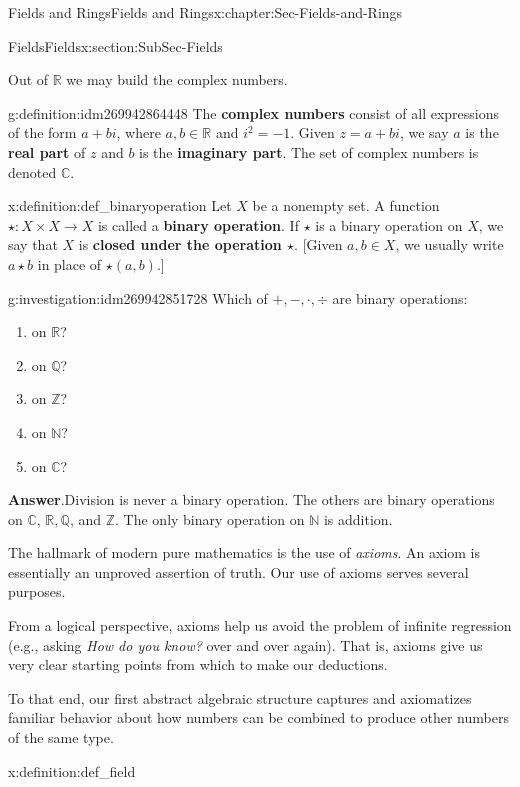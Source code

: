 \documentclass[oneside,10pt,]{book}
\newcommand{\terminology}[1]{\textbf{#1}}
\numberwithin{equation}{section}
\def\C{{\mathbb C}}
\def\Z{{\mathbb Z}}
\def\Q{{\mathbb Q}}
\def\N{{\mathbb N}}
\def\R{{\mathbb R}}
\begin{document}
\begin{chapterptx}{Fields and Rings}{}{Fields and Rings}{}{}{x:chapter:Sec-Fields-and-Rings}
\begin{sectionptx}{Fields}{}{Fields}{}{}{x:section:SubSec-Fields}
\par
Out of \(\R\) we may build the complex numbers.%
\begin{definition}{}{g:definition:idm269942864448}%
The \terminology{complex numbers} consist of all expressions of the form \(a+bi\), where \(a,b\in \R\) and \(i^2 = -1\). Given \(z = a+bi\), we say \(a\) is the \terminology{real part} of \(z\) and \(b\) is the \terminology{imaginary part}. The set of complex numbers is denoted \(\C\).%
\end{definition}
\begin{definition}{}{x:definition:def_binaryoperation}%
 Let \(X\) be a nonempty set. A function \(\star : X \times X \to X\) is called a \terminology{binary operation}. If \(\star\) is a binary operation on \(X\), we say that \(X\) is \terminology{closed under the operation \(\star\)}. [Given \(a,b\in X\), we usually write \(a\star b\) in place of \(\star(a,b)\).]%
\end{definition}
\begin{investigation}{}{g:investigation:idm269942851728}%
Which of \(+, -, \cdot, \div\) are binary operations:%
\begin{enumerate}
\item{}on \(\R\)?%
\item{}on \(\Q\)?%
\item{}on \(\Z\)?%
\item{}on \(\N\)?%
\item{}on \(\C\)?%
\end{enumerate}
%
\par\smallskip%
\noindent\textbf{Answer}.\hypertarget{g:answer:idm269942843328}{}\quad{}Division is never a binary operation. The others are binary operations on \(\C\), \(\R, \Q\), and \(\Z\). The only binary operation on \(\N\) is addition.%
\end{investigation}
The hallmark of modern pure mathematics is the use of \emph{axioms}. An axiom is essentially an unproved assertion of truth. Our use of axioms serves several purposes.%
\par
From a logical perspective, axioms help us avoid the problem of infinite regression (e.g., asking \emph{How do you know?} over and over again). That is, axioms give us very clear starting points from which to make our deductions.%
\par
To that end, our first abstract algebraic structure captures and axiomatizes familiar behavior about how numbers can be combined to produce other numbers of the same type.%
\begin{definition}{}{x:definition:def_field}%

\end{definition}
\end{sectionptx}
\end{chapterptx}
\end{document}
